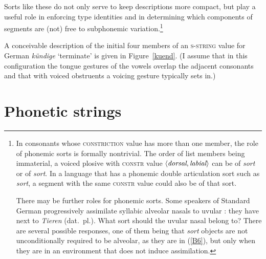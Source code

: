 \documentclass[output=paper]{langsci/langscibook}
\begin{document}
% 
Sorts like these do not only serve to keep descriptions more compact, but
play a useful role in enforcing type identities and in determining which
components of segments are (not) free to subphonemic variation.\footnote{%
	In
  consonants whose \textsc{constriction} value has more than one member, the
  role of phonemic sorts is formally nontrivial. The order of list members
  being immaterial, a voiced plosive with \textsc{constr} value $\left\langle
    \textit{dorsal}, \textit{labial}\/ \right\rangle$ can be of \textit{sort}{\textunderscore} or of \textit{sort}{\textunderscore}. In a language that has a
  phonemic double articulation sort such as \textit{sort}{\textunderscore}{}, a
  segment with the same \textsc{constr} value could also be of that sort.
  
  There may be further roles for phonemic sorts. Some speakers of Standard
  German progressively assimilate syllabic alveolar
  nasals to uvular {\textipa{[K]}}: they have {\textipa{[ti:.K\textscn]}}
  next to {\textipa{[ti:.Kn]}} \emph{Tieren} (dat.\ pl.). What sort should
  the uvular nasal belong to? There are several possible responses, one of
  them being that \textit{sort}{\textunderscore} objects are not unconditionally
  required to be alveolar, as they are in (\ref{B6}), but only when they
  are in an environment that does not induce assimilation.%
}

A conceivable description of the initial four members of an \textsc{s-string}
value for German \textipa{[kYndIg@]} \emph{k\"undige} `terminate'
is given in Figure~\ref{kuend}. (I assume that in this configuration the
tongue gestures of the vowels overlap the adjacent consonants and that with
voiced obstruents a voicing gesture typically sets in.)
 





\section{Phonetic strings}
\label{sectPhonstr}
\end{document}
